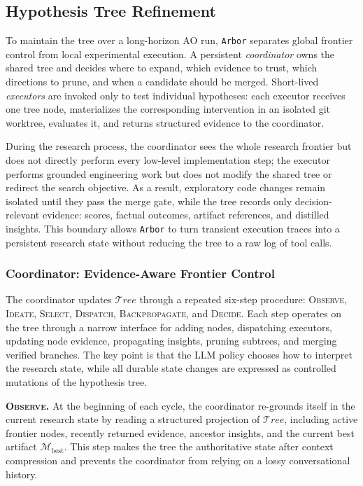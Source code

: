 \documentclass[]{selfevolagent}
\theoremstyle{plain}
\theoremstyle{definition}
\theoremstyle{remark}
\newcommand{\arbor}{\texttt{Arbor}}
\newcommand{\Mat}{\mathcal{M}}
\newcommand{\Tree}{\mathcal{T}\!\textit{ree}}
\begin{document}
\subsection{Hypothesis Tree Refinement}
\label{sec:framework-loop}
\label{sec:framework-roles}
To maintain the tree over a long-horizon AO run, \arbor{} separates global
frontier control from local experimental execution. A persistent
\emph{coordinator} owns the shared tree and decides where to expand, which
evidence to trust, which directions to prune, and when a candidate should be
merged. Short-lived \emph{executors} are invoked only to test individual
hypotheses: each executor receives one tree node, materializes the corresponding
intervention in an isolated git worktree, evaluates it, and returns structured
evidence to the coordinator.

During the research process, the coordinator sees the whole research
frontier but does not directly perform every low-level implementation step; the
executor performs grounded engineering work but does not modify the shared tree
or redirect the search objective. As a result, exploratory code changes remain
isolated until they pass the merge gate, while the tree records only
decision-relevant evidence: scores, factual outcomes, artifact references, and
distilled insights. This boundary allows \arbor{} to turn transient execution
traces into a persistent research state without reducing the tree to a raw log
of tool calls.

\subsubsection{Coordinator: Evidence-Aware Frontier Control}
\label{sec:framework-loop-policy}
The coordinator updates $\Tree$ through a repeated six-step procedure:
\textsc{Observe}, \textsc{Ideate}, \textsc{Select}, \textsc{Dispatch},
\textsc{Backpropagate}, and \textsc{Decide}. Each step operates on the tree
through a narrow interface for adding nodes, dispatching executors, updating
node evidence, propagating insights, pruning subtrees, and merging verified
branches. The key point is that the LLM policy chooses how to interpret the
research state, while all durable state changes are expressed as controlled
mutations of the hypothesis tree.

\textbf{\textsc{Observe}.}
At the beginning of each cycle, the coordinator re-grounds itself in the current
research state by reading a structured projection of $\Tree$, including active
frontier nodes, recently returned evidence, ancestor insights, and the current
best artifact $\Mat_{\mathrm{best}}$. This step makes the tree the authoritative
state after context compression and prevents the coordinator from relying on a
lossy conversational history.
\end{document}
